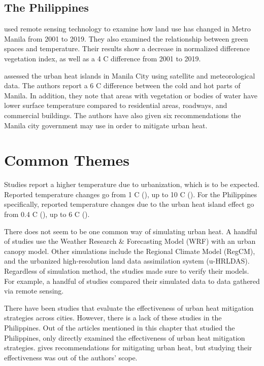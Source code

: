 		

	\subsection{The Philippines}
		\textcite{AlmadronesReyes2022} used remote sensing technology to examine how land use has changed in Metro Manila from 2001 to 2019. 
		They also examined the relationship between green spaces and temperature. 
		Their results show a decrease in normalized difference vegetation index, 
			as well as a 4 \degree C difference from 2001 to 2019.
		
		\textcite{Purio2022} assessed the urban heat islands in Manila City using satellite and meteorological data.
		The authors report a 6 \degree C difference between the cold and hot parts of Manila.
		In addition, they note that areas with vegetation or bodies of water have lower surface temperature compared to residential areas, roadways, and commercial buildings.
		The authors have also given six recommendations the Manila city government may use in order to mitigate urban heat.

\section{Common Themes}
	Studies report a higher temperature due to urbanization, which is to be expected.
	Reported temperature changes go from 1 \degree C (\cite{Huszar2018a}), 
		up to 10 \degree C (\cite{Santamouris2020}).
	For the Philippines specifically, reported temperature changes due to the urban heat island effect go from 0.4 \degree C (\cite{Oliveros2019}),
		up to 6 \degree C (\cite{Purio2022}).
	
	There does not seem to be one common way of simulating urban heat.
	A handful of studies use the Weather Research \& Forecasting Model (WRF) with an urban canopy model.
	Other simulations include the Regional Climate Model (RegCM), and
		the urbanized high-resolution land data assimilation system (u-HRLDAS).
	Regardless of simulation method, the studies made sure to verify their models. For example, a handful of studies compared their simulated data to data gathered via remote sensing.
	
	There have been studies that evaluate the effectiveness of urban heat mitigation strategies across cities. 
	However, there is a lack of these studies in the Philippines.
	Out of the articles mentioned in this chapter that studied the Philippines, only \textcite{Cortes2022} directly examined the effectiveness of urban heat mitigation strategies.
	\textcite{Purio2022} gives recommendations for mitigating urban heat, but studying their effectiveness was out of the authors' scope.
	
